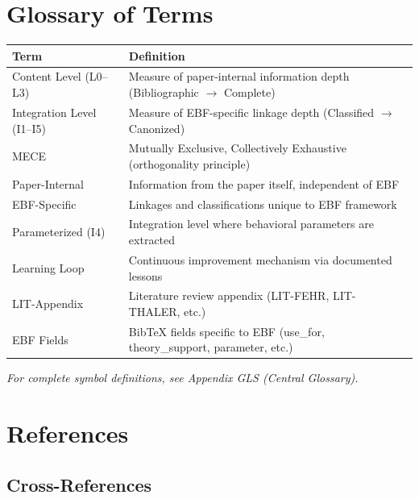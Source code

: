
\section{Glossary of Terms}

\begin{tabular}{@{}lp{8cm}@{}}
\toprule
\textbf{Term} & \textbf{Definition} \\
\midrule
Content Level (L0--L3) & Measure of paper-internal information depth (Bibliographic $\rightarrow$ Complete) \\
Integration Level (I1--I5) & Measure of EBF-specific linkage depth (Classified $\rightarrow$ Canonized) \\
MECE & Mutually Exclusive, Collectively Exhaustive (orthogonality principle) \\
Paper-Internal & Information from the paper itself, independent of EBF \\
EBF-Specific & Linkages and classifications unique to EBF framework \\
Parameterized (I4) & Integration level where behavioral parameters are extracted \\
Learning Loop & Continuous improvement mechanism via documented lessons \\
LIT-Appendix & Literature review appendix (LIT-FEHR, LIT-THALER, etc.) \\
EBF Fields & BibTeX fields specific to EBF (use\_for, theory\_support, parameter, etc.) \\
\bottomrule
\end{tabular}

\vspace{1em}
\textit{For complete symbol definitions, see Appendix GLS (Central Glossary).}


\section{References}
\label{sec:paperint-references}

\subsection{Cross-References}

